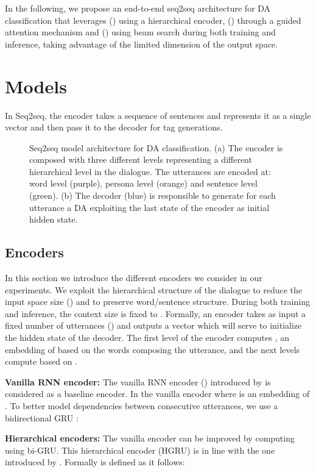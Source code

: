 \documentclass[letterpaper]{article} \usepackage{aaai20}  \usepackage{times}  \usepackage{helvet} \usepackage{courier}  \usepackage[hyphens]{url}  \usepackage{graphicx} \urlstyle{rm} \def\UrlFont{\rm}  \usepackage{graphicx}  \frenchspacing  \setlength{\pdfpagewidth}{8.5in}  \setlength{\pdfpageheight}{11in}
\newcommand{\citet}[1]{\citeauthor{#1} \shortcite{#1}}
\begin{document}
In the following, we propose an end-to-end seq2seq architecture for DA classification that leverages () using a hierarchical encoder, () through a guided attention mechanism and () using beam search during both training and inference, taking advantage of the limited dimension of the output space. 

\section{Models}
In Seq2seq, the encoder takes a sequence of sentences and represents it as a single vector  and then pass it to the decoder for tag generations.
\begin{figure*}[!th]
  \caption{\label{fig:architecture}Seq2seq model architecture for DA classification. (a) The encoder is composed with three different levels representing a different hierarchical level in the dialogue. The utterances are encoded at: word level (purple), persona level (orange) and sentence level (green). (b) The decoder (blue) is responsible to generate for each utterance a DA exploiting the last state of the encoder as initial hidden state.
   } 
\end{figure*}

\subsection{Encoders}
In this section we introduce the different encoders we consider in our experiments. We exploit the hierarchical structure of the dialogue to reduce the input space size () and to preserve word/sentence structure. During both training and inference, the context size is fixed to . Formally, an encoder takes as input a fixed number of utterances () and outputs a vector  which will serve to initialize the hidden state of the decoder. The first level of the encoder computes , an embedding of  based on the words composing the utterance, and the next levels compute  based on .

\noindent\textbf{Vanilla RNN encoder:} The vanilla RNN encoder () introduced by \citet{seq2seq} is considered as a baseline encoder. In the vanilla encoder  where  is an embedding of . To better model dependencies between consecutive utterances, we use a bidirectional GRU \cite{grupaper}:



\noindent\textbf{Hierarchical encoders:} The vanilla encoder can be improved by computing  using bi-GRU. This hierarchical encoder (HGRU) is in line with the one introduced by \citet{hierarchical_encoder}. Formally  is defined as it follows:
\end{document}
